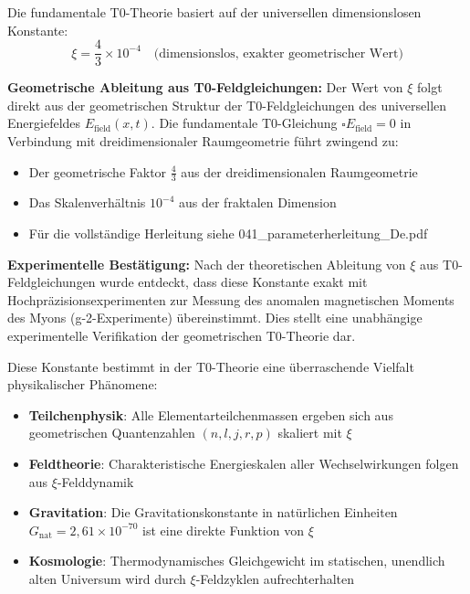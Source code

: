 	Die fundamentale T0-Theorie basiert auf der universellen dimensionslosen Konstante:
	\begin{equation}
		\xi = \frac{4}{3} \times 10^{-4} \quad \text{(dimensionslos, exakter geometrischer Wert)}
	\end{equation}
	
	\textbf{Geometrische Ableitung aus T0-Feldgleichungen:} Der Wert von $\xi$ folgt direkt aus der geometrischen Struktur der T0-Feldgleichungen des universellen Energiefeldes $E_{\text{field}}(x,t)$. Die fundamentale T0-Gleichung $\square E_{\text{field}} = 0$ in Verbindung mit dreidimensionaler Raumgeometrie führt zwingend zu:
\begin{itemize}
	\item Der geometrische Faktor $\frac{4}{3}$ aus der dreidimensionalen Raumgeometrie
	\item Das Skalenverhältnis $10^{-4}$ aus der fraktalen Dimension
	\item Für die vollständige Herleitung siehe 041\_parameterherleitung\_De.pdf 
\end{itemize}
	
	\textbf{Experimentelle Bestätigung:} Nach der theoretischen Ableitung von $\xi$ aus T0-Feldgleichungen wurde entdeckt, dass diese Konstante exakt mit Hochpräzisionsexperimenten zur Messung des anomalen magnetischen Moments des Myons (g-2-Experimente) übereinstimmt. Dies stellt eine unabhängige experimentelle Verifikation der geometrischen T0-Theorie dar.
	
	Diese Konstante bestimmt in der T0-Theorie eine überraschende Vielfalt physikalischer Phänomene:
	\begin{itemize}
		\item \textbf{Teilchenphysik}: Alle Elementarteilchenmassen ergeben sich aus geometrischen Quantenzahlen $(n,l,j,r,p)$ skaliert mit $\xi$
		\item \textbf{Feldtheorie}: Charakteristische Energieskalen aller Wechselwirkungen folgen aus $\xi$-Felddynamik
		\item \textbf{Gravitation}: Die Gravitationskonstante in natürlichen Einheiten $G_{\text{nat}} = 2{,}61 \times 10^{-70}$ ist eine direkte Funktion von $\xi$
		\item \textbf{Kosmologie}: Thermodynamisches Gleichgewicht im statischen, unendlich alten Universum wird durch $\xi$-Feldzyklen aufrechterhalten
	\end{itemize}
	
